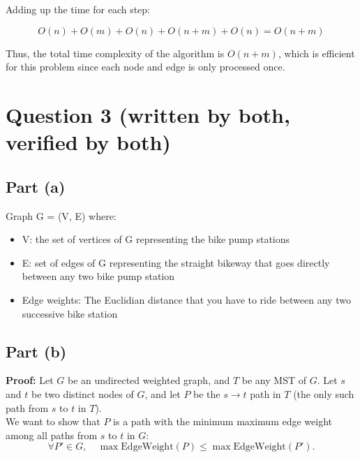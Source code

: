 \documentclass{article}
\begin{document}
Adding up the time for each step:

\[
O(n) + O(m) + O(n) + O(n + m) + O(n) = O(n + m)
\]

Thus, the total time complexity of the algorithm is \( O(n + m) \), which is efficient for this problem since each node and edge is only processed once.

\section*{Question 3 (written by both, verified by both)}
\subsection*{Part (a)}
Graph G = (V, E) where: 
\begin{itemize}
    \item V: the set of vertices of G representing the bike pump stations
    \item E: set of edges of G representing the straight bikeway that goes directly between any two bike pump station
    \item Edge weights: The Euclidian distance that you have to ride between any two successive bike station
\end{itemize}

\subsection*{Part (b)}
\textbf{Proof:} Let \( G \) be an undirected weighted graph, and \( T \) be any MST of \( G \). Let \( s \) and \( t \) be two distinct nodes of \( G \), and let \( P \) be the \( s \to t \) path in \( T \) (the only such path from \( s \) to \( t \) in \( T \)). \\

We want to show that \( P \) is a path with the minimum maximum edge weight among all paths from \( s \) to \( t \) in \( G \): 
\[
\forall P' \in G, \quad \max \text{EdgeWeight}(P) \leq \max \text{EdgeWeight}(P').
\]
\end{document}
